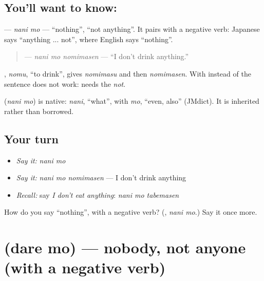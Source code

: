 \subsection*{You'll want to know: }
\textbf{} — \emph{nani mo} — \textquotedblleft{}nothing\textquotedblright{}, \textquotedblleft{}not anything\textquotedblright{}. It pairs with a negative verb: Japanese says \textquotedblleft{}anything ... not\textquotedblright{}, where English says \textquotedblleft{}nothing\textquotedblright{}.

\begin{quote}
\textbf{ } — \emph{nani mo nomimasen} — \textquotedblleft{}I don't drink anything.\textquotedblright{}
\end{quote}

\textbf{}, \emph{nomu}, \textquotedblleft{}to drink\textquotedblright{}, gives \textbf{} \emph{nomimasu} and then \textbf{} \emph{nomimasen}. With \textbf{} instead of \textbf{} the sentence does not work: \textbf{} needs the \emph{not}.

\begin{cousinweb}
\textbf{} (\emph{nani mo}) is native: \emph{nani}, \textquotedblleft{}what\textquotedblright{}, with \emph{mo}, \textquotedblleft{}even, also\textquotedblright{} (JMdict). It is inherited rather than borrowed.
\end{cousinweb}

\subsection*{Your turn}
\begin{itemize}
\raggedright
  \item \emph{Say it:} \emph{nani mo}
  \item \emph{Say it:} \emph{nani mo nomimasen} — I don't drink anything
  \item \emph{Recall:} say \emph{I don't eat anything}: \emph{nani mo tabemasen}
\end{itemize}

\begin{tcolorbox}[breakable,colback=teal!4,colframe=teal!35!black,title={Before you move on}]
How do you say \textquotedblleft{}nothing\textquotedblright{}, with a negative verb? (\textbf{}, \emph{nani mo}.) Say it once more.
\end{tcolorbox}
\section[\texorpdfstring{\ja{だれも} (dare mo)}{だれも (dare mo)}]{ (dare mo) — nobody, not anyone (with a negative verb)}

